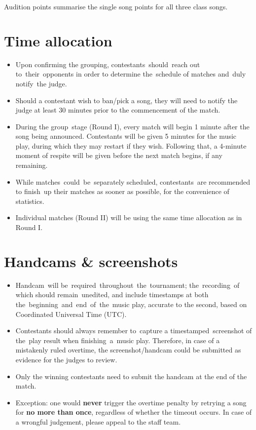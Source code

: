 \documentclass{article}
\begin{document}
Audition points summarise the single song points
for all three class songs.

\section{Time allocation}
\begin{itemize}
	\item Upon confirming the grouping,
	      contestants should reach out to their opponents
	      in order to determine the schedule of matches
	      and duly notify the judge.

	\item Should a contestant wish to ban/pick a song,
	      they will need to notify the judge at least 30 minutes
	      prior to the commencement of the match.

	\item During the group stage (Round I),
	      every match will begin 1 minute
	      after the song being announced.
	      Contestants will be given 5 minutes for the music play,
	      during which they may restart if they wish.
	      Following that, a 4-minute moment of respite will be given
	      before the next match begins, if any remaining.

	\item While matches could be separately scheduled,
	      contestants are recommended to finish up their matches
	      as sooner as possible, for the convenience of statistics.

	\item Individual matches (Round II) will be using the same time allocation as in Round I.
\end{itemize}

\section{Handcams \& screenshots}
\begin{itemize}
	\item Handcam will be required throughout the tournament;
	      the recording of which should remain unedited,
	      and include timestamps
	      at both the beginning and end of the music play,
	      accurate to the second,
	      based on Coordinated Universal Time (UTC).

	\item Contestants should always remember to capture
	      a timestamped screenshot of the play result
	      when finishing a music play.
	      Therefore, in case of a mistakenly ruled overtime,
	      the screenshot/handcam could be
	      submitted as evidence for the judges to review.

	\item Only the winning contestants need to submit the handcam
	      at the end of the match.

	\item Exception: one would \textbf{never}
	      trigger the overtime penalty
	      by retrying a song
	      for \textbf{no more than once},
	      regardless of whether the timeout occurs.
	      In case of a wrongful judgement,
	      please appeal to the staff team.
\end{itemize}
\end{document}
